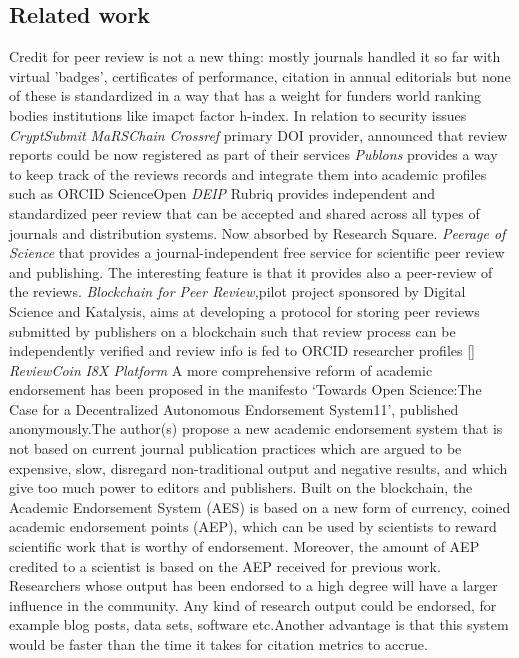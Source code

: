 \documentclass[runningheads]{llncs}
\begin{document}
\subsection{Related work}
Credit for peer review is not a new thing: mostly journals handled it so far with virtual 'badges', certificates of performance, citation in annual editorials but none of these is standardized in a way that has a weight for funders world ranking bodies institutions like imapct factor h-index.
In relation to security issues \emph{CryptSubmit} \emph{MaRSChain}
\emph{Crossref} primary DOI provider, announced that review reports could be now registered as part of their services
\emph{Publons} provides a way to keep track of the reviews records and integrate them into academic profiles such as ORCID
ScienceOpen
\emph{DEIP}
Rubriq provides independent and standardized peer review that can be accepted and shared across all types of journals and distribution systems. Now absorbed by Research Square.
\emph{Peerage of Science} that provides a journal-independent free service for scientific peer review and publishing. The interesting feature is that it provides also a peer-review of the reviews.
\emph{Blockchain for Peer Review,}pilot project sponsored by Digital Science and Katalysis, aims at developing a protocol for storing peer reviews submitted by publishers on a blockchain such that review process can be independently verified and review info is fed to ORCID researcher profiles []
\emph{ReviewCoin}
\emph{I8X Platform}
A more comprehensive reform of academic endorsement has been proposed in the manifesto ‘Towards Open Science:The Case for a Decentralized Autonomous Endorsement System11’, published anonymously.The author(s) propose a new academic endorsement system that is not based on current journal publication practices which are argued to be expensive, slow, disregard non-traditional output and negative results, and which give too much power to editors and publishers. Built on the blockchain, the Academic Endorsement System (AES) is based on a new form of currency, coined academic endorsement points (AEP), which can be used by scientists to reward scientific work that is worthy of endorsement. Moreover, the amount of AEP credited to a scientist is based on the AEP received for previous work. Researchers whose output has been endorsed to a high degree will have a larger influence in the community. Any kind of research output could be endorsed, for example blog posts, data sets, software etc.Another advantage is that this system would be faster than the time it takes for citation metrics to accrue.
\end{document}
